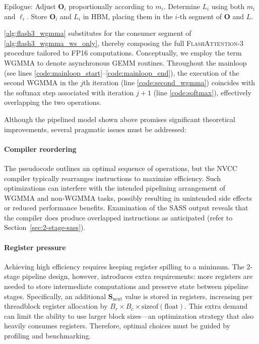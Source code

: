\begin{enumerate}
\begin{algorithm}[H]
\begin{algorithmic}[1]
\STATE Epilogue: Adjust $\mathbf{O}_{i}$ proportionally according to $m_{i}$. Determine $L_{i}$ using both $m_{i}$ and $\ell_{i}$.
Store $\mathbf{O}_{i}$ and $L_{i}$ in HBM, placing them in the $i$-th segment of $\mathbf{O}$ and $L$.

\cref{alg:flash3_wgmma} substitutes for the consumer segment of \cref{alg:flash3_wgmma_ws_only}, thereby composing the full \textsc{FlashAttention-3} procedure tailored to FP16 computations. Conceptually, we employ the term WGMMA to denote asynchronous GEMM routines. Throughout the mainloop (see lines \ref{code:mainloop_start}–\ref{code:mainloop_end}), the execution of the second WGMMA in the $j$th iteration (line \ref{code:second_wgmma}) coincides with the softmax step associated with iteration $j+1$ (line \ref{code:softmax}), effectively overlapping the two operations.

Although the pipelined model shown above promises significant theoretical improvements, several pragmatic issues must be addressed:

\paragraph{Compiler reordering} The pseudocode outlines an optimal sequence of operations, but the NVCC compiler typically rearranges instructions to maximize efficiency. Such optimizations can interfere with the intended pipelining arrangement of WGMMA and non-WGMMA tasks, possibly resulting in unintended side effects or reduced performance benefits. Examination of the SASS output reveals that the compiler does produce overlapped instructions as anticipated (refer to Section~\ref{sec:2-stage-sass}).

\paragraph{Register pressure} Achieving high efficiency requires keeping register spilling to a minimum. The 2-stage pipeline design, however, introduces extra requirements: more registers are needed to store intermediate computations and preserve state between pipeline stages. Specifically, an additional $\mathbf{S}_{\mathrm{next}}$ value is stored in registers, increasing per threadblock register allocation by $B_r \times B_c \times \text{sizeof}(\text{float})$. This extra demand can limit the ability to use larger block sizes—an optimization strategy that also heavily consumes registers. Therefore, optimal choices must be guided by profiling and benchmarking.


\end{algorithmic}
\end{algorithm}
\end{enumerate}
